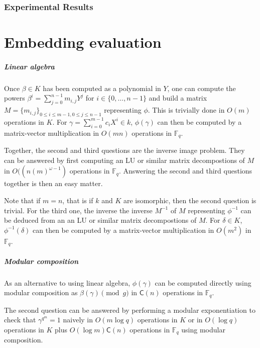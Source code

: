 \documentclass[12pt]{article}
\theoremstyle{plain}
\theoremstyle{definition}
\def\F{\ensuremath{\mathbb{F}}}
\def\MC{\ensuremath{\mathsf{C}}}
\begin{document}
\section{Experimental Results}


\part{Embedding evaluation}
\label{part:eval}


\subsubsection{Linear algebra}

Once $\beta \in K$ has been computed as a polynomial in $Y$,
one can compute the powers
$\beta^i = \sum_{j=0}^{n-1} m_{i,j} Y^j$
for $i \in \{0, \ldots, n-1\}$ and build a matrix
$M = \{m_{i, j}\}_{0\leq i \leq m-1, 0 \leq j \leq n -1}$
representing $\phi$.
This is trivially done in $O(m)$ operations in $K$.
For $\gamma = \sum_{i = 0}^{m - 1} c_i X^i \in k$,
$\phi(\gamma)$ can then be computed by a
matrix-vector multiplication in $O(m n)$ operations in $\F_q$.

Together, the second and third questions are the inverse image problem.
They can be answered by first computing 
an LU or similar matrix decompostions of $M$
in $O((n (m)^{\omega - 1})$ operations in $\F_q$.
Answering the second and third questions together is then
an easy matter.

Note that if $m = n$, that is if $k$ and $K$ are
isomorphic, then the second question is trivial.
For the third one, the inverse
the inverse $M^{-1}$ of $M$ representing $\phi^{-1}$
can be deduced from an an LU or similar matrix decompostions of $M$.
For $\delta \in K$, $\phi^{-1}(\delta)$ can then be computed by a
matrix-vector multiplication in $O(m^2)$ in $\F_q$.

\subsubsection{Modular composition}

As an alternative to using linear algebra,
$\phi(\gamma)$ can be computed directly using modular composition
as $\beta(\gamma) \pmod{g}$ in $\MC(n)$ operations in $\F_q$.

The second question can be answered by performing a modular
exponentiation to check that $\gamma^{q^{m}} = 1$
naively in $O(m \log q)$ operations in $K$
or in $O(\log q)$ operations in $K$ plus
$O(\log m) \MC(n)$ operations in $\F_q$ using modular composition.
\end{document}
